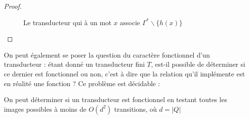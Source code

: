\documentclass{scrartcl}
\begin{document}
\begin{flushleft}
\begin{proof}
\begin{figure}[h] 
    \caption{Le transducteur qui à un mot $x$ associe $\Gamma^* \backslash \{h(x)\}$} \label{autoG-h}
    \begin{center}
    \end{center}
\end{figure}
\end{proof}

On peut également se poser la question du caractère fonctionnel d'un transducteur : étant donné un transducteur fini $T$, est-il possible de déterminer
si ce dernier est fonctionnel ou non, c'est à dire que la relation qu'il implémente est en réalité une fonction ? Ce problème est décidable
\cite{sakarovitch}  :
\begin{theorem}
    On peut déterminer si un transducteur est fonctionnel en testant toutes les images possibles à moins de $O(d^2)$ transitions,
    où $d = |Q|$
\end{theorem}


\end{flushleft}
\end{document}
